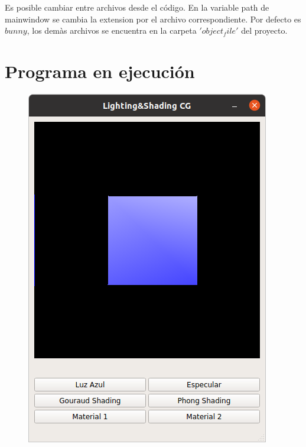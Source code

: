 \documentclass[12pt]{article}
\begin{document}
Es posible cambiar entre archivos desde el código. En la variable path de mainwindow se cambia la extension por el archivo correspondiente. Por defecto es $bunny$, los demàs archivos se encuentra en la carpeta $'object_file'$ del proyecto.


\section{Programa en ejecución}

\begin{figure}[H]
\centering
\includegraphics[scale=0.5]{images/ej1.png}

\end{figure}
\end{document}
